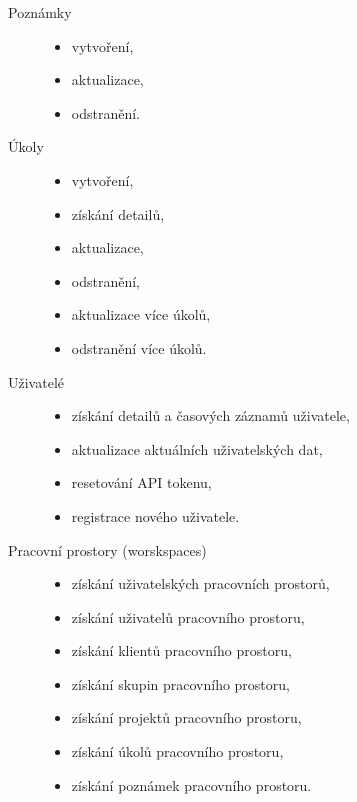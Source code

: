 \documentclass[thesis=B,czech]{FITthesis}[2012/06/26]
\begin{document}
\begin{description}
		\item[Poznámky] \hspace*{\fill} 
		\begin{itemize} 
			\item vytvoření,
			\item aktualizace,
			\item odstranění.
		\end{itemize}
		
		\item[Úkoly] \hspace*{\fill}
		\begin{itemize} 
			\item vytvoření,
			\item získání detailů,
			\item aktualizace,
			\item odstranění,
			\item aktualizace více úkolů,
			\item odstranění více úkolů.
		\end{itemize} 
		
		\item[Uživatelé] \hspace*{\fill} 
		\begin{itemize} 
			\item získání detailů a časových záznamů uživatele,
			\item aktualizace aktuálních uživatelských dat,
			\item resetování API tokenu,
			\item registrace nového uživatele.
		\end{itemize} 
		
		\item[Pracovní prostory (worskspaces)] \hspace*{\fill} 
		\begin{itemize} 
			\item získání uživatelských pracovních prostorů,
			\item získání uživatelů pracovního prostoru,
			\item získání klientů pracovního prostoru,
			\item získání skupin pracovního prostoru,
			\item získání projektů pracovního prostoru,
			\item získání úkolů pracovního prostoru,
			\item získání poznámek pracovního prostoru.
		\end{itemize} 
		

\end{description}
\end{document}
